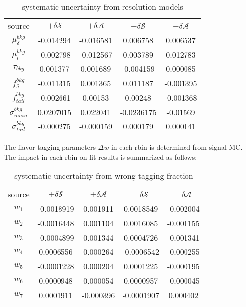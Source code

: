 \begin{table}[H]
	\begin{minipage}[b]{1.0\linewidth}
		\centering
		\caption{systematic uncertainty from resolution models}
		\begin{tabular}{c c c c c}
			\hline
			source & $+\delta \mathcal{S}$ & $+\delta \mathcal{A}$ & $-\delta \mathcal{S}$ &  $-\delta \mathcal{A}$\\
		$\mu^{bkg}_{\delta}$ & -0.014294
& -0.016581
& 0.006758
& 0.006537
\\
		$\mu^{bkg}_{l}$&  -0.002798
& -0.012567
& 0.003789
& 0.012783
\\
		$\tau_{bkg}$ & 0.001377
& 0.001689
& -0.004159
& 0.000085\\
		$f_{\delta}^{bkg}$ &  -0.011315
& 0.001365
& 0.011187
& -0.001395
\\
		$f^{bkg}_{tail}$  &-0.002661
& 0.00153
& 0.00248
& -0.001368
\\
		$\sigma^{bkg}_{main}$ & 0.0207015
& 0.022041
& -0.0236175
& -0.01569
\\
		$\sigma^{bkg}_{tail}$ & -0.000275 & -0.000159
& 0.000179
& 0.000141
\\
			\hline
		\end{tabular}
	\end{minipage}
\end{table}
The flavor tagging parameters $\Delta w$ in each rbin is determined from signal MC. The impact in each rbin on fit results is summarized as follows: 
\begin{table}[H]
	\begin{minipage}[b]{1.0\linewidth}
		\centering
		\caption{systematic uncertainty from wrong tagging fraction}
		\begin{tabular}{c c c c c}
			\hline
			source & $+\delta \mathcal{S}$ & $+\delta \mathcal{A}$ & $-\delta \mathcal{S}$ &  $-\delta \mathcal{A}$\\
			$w_1$ & -0.0018919
& 0.001911
& 0.0018549
& -0.002004
\\
			$ w_2$ & -0.0016448
& 0.001104
& 0.0016085
& -0.001155
\\
			$ w_3$ & -0.0004899
& 0.001344
& 0.0004726
& -0.001341
\\
			$ w_4$ & 0.0006556
& 0.000264
& -0.0006542
& -0.000255 \\
			$ w_5$ & -0.0001228
& 0.000204
& 0.0001225 &
-0.000195
\\
			$ w_6$ & 0.0000948 & 0.000054 & 0.0000957 & -0.000045 \\
			$ w_7$ & 0.0001911
& -0.000396
& -0.0001907
& 0.000402
\\
			\hline
		\end{tabular}
	\end{minipage}
\end{table}
